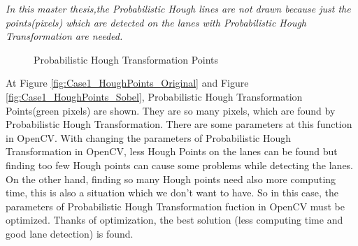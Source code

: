 \emph{\color{blue}In this master thesis,the Probabilistic Hough lines are not drawn because just the points(pixels) which are detected on the lanes with Probabilistic Hough Transformation are needed. }


\begin{figure}[H]
  \centering
  \hfill
  \caption{Probabilistic Hough Transformation Points}
\end{figure} 
 
At Figure \ref{fig:Case1_HoughPoints_Original} and Figure \ref{fig:Case1_HoughPoints_Sobel}, Probabilistic Hough Transformation Points(green pixels) are shown. They are so many pixels, which are found by Probabilistic Hough Transformation. There are some parameters at this function in OpenCV.  With changing the parameters of Probabilistic Hough Transformation in OpenCV, less Hough Points on the lanes can be found but finding too few Hough points can cause some problems while detecting the lanes. On the other hand, finding so many Hough points need also more computing time, this is also a situation which we don't want to have. So in this case, the parameters of Probabilistic Hough Transformation fuction in OpenCV must be optimized. Thanks of optimization, the best solution (less computing time and good lane detection) is found.

